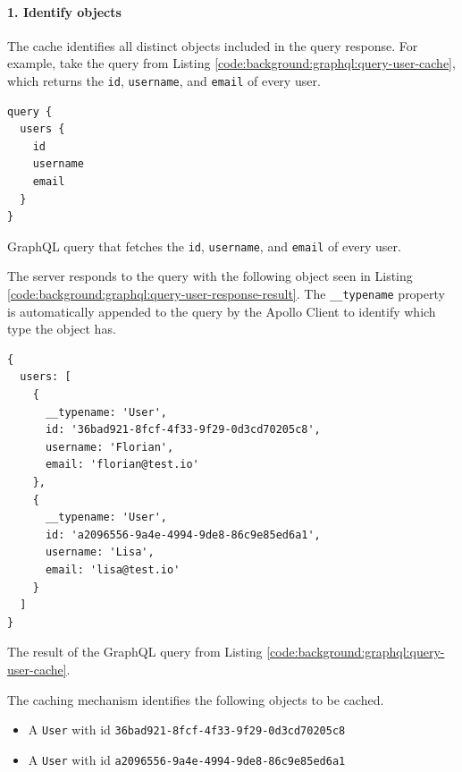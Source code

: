 \paragraph{1. Identify objects}\label{paragraph:background:graphql:apollo-server-client:data-normalization:identify-objects}

The cache identifies all distinct objects included in the query response. For example, take the query from Listing \ref{code:background:graphql:query-user-cache}, which returns the \texttt{id}, \texttt{username}, and \texttt{email} of every user.

\ifshowListings
\begin{listing}[H]
  \begin{verbatim}
query {
  users {
    id
    username
    email
  }
}
  \end{verbatim}
  \caption{GraphQL query that fetches the \texttt{id}, \texttt{username}, and \texttt{email} of every user.}\label{code:background:graphql:query-user-cache}
\end{listing}
\fi

\noindent The server responds to the query with the following object seen in Listing \ref{code:background:graphql:query-user-response-result}. The \texttt{\_\_typename} property is automatically appended to the query by the Apollo Client to identify which type the object has.

\ifshowListings
\begin{listing}[H]
  \begin{verbatim}
{
  users: [
    {
      __typename: 'User',
      id: '36bad921-8fcf-4f33-9f29-0d3cd70205c8',
      username: 'Florian',
      email: 'florian@test.io'
    },
    {
      __typename: 'User',
      id: 'a2096556-9a4e-4994-9de8-86c9e85ed6a1',
      username: 'Lisa',
      email: 'lisa@test.io'
    }
  ]
}
  \end{verbatim}
  \caption{The result of the GraphQL query from Listing \ref{code:background:graphql:query-user-cache}.}\label{code:background:graphql:query-user-response-result}
\end{listing}
\fi

The caching mechanism identifies the following objects to be cached.

\begin{itemize}
  \item A \texttt{User} with id \texttt{36bad921-8fcf-4f33-9f29-0d3cd70205c8}
  \item A \texttt{User} with id \texttt{a2096556-9a4e-4994-9de8-86c9e85ed6a1}
\end{itemize}

